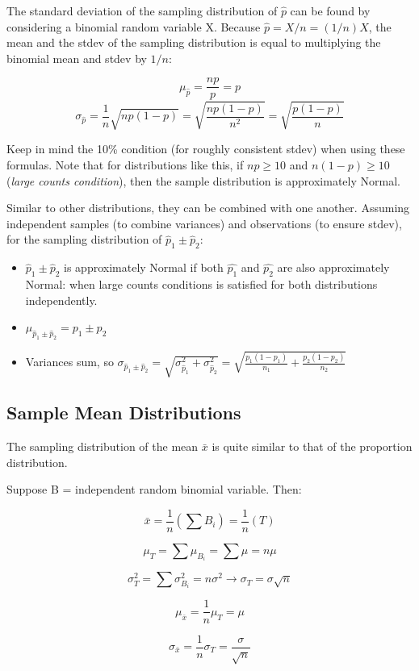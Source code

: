 \documentclass[12pt, a4paper]{article}
\theoremstyle{definition}
\begin{document}
The standard deviation of the sampling distribution of $\hat{p}$ can be found by considering a binomial random variable X.
Because $\hat{p} = X/n = (1/n)X$, the mean and the stdev of the sampling distribution is equal to multiplying the binomial mean and stdev by $1/n$:

\[\mu_{\hat{p}} = \frac{np}{p} = p\]
\[\sigma_{\hat{p}} = \frac{1}{n}\sqrt{np(1-p)} = \sqrt{\frac{np(1-p)}{n^2}} = \sqrt{\frac{p(1-p)}{n}}\]

Keep in mind the 10\% condition (for roughly consistent stdev) when using these formulas.
Note that for distributions like this, if $np \geq 10$ and $n(1-p) \geq 10$ (\textit{large counts condition}), then the sample distribution is approximately Normal.

Similar to other distributions, they can be combined with one another.
Assuming independent samples (to combine variances) and observations (to ensure stdev), for the sampling distribution of $\hat{p}_1 \pm \hat{p}_2$:
\begin{itemize}
    \item $\hat{p}_1 \pm \hat{p}_2$ is approximately Normal if both $\hat{p_1}$ and $\hat{p_2}$ are also approximately Normal: when large counts conditions is satisfied for both distributions independently.
    \item $\mu_{\hat{p}_1 \pm \hat{p}_2} = p_1 \pm p_2$
    \item Variances sum, so $\sigma_{\hat{p}_1 \pm \hat{p}_2} = \sqrt{\sigma^2_{\hat{p}_1} + \sigma^2_{\hat{p}_2}} = \sqrt{\frac{p_1 (1 - p_1)}{n_1} + \frac{p_2 (1 - p_2)}{n_2}}$
\end{itemize}

\subsection{Sample Mean Distributions}
The sampling distribution of the mean $\bar{x}$ is quite similar to that of the proportion distribution.

Suppose B = independent random binomial variable. Then:

\[\bar{x} = \frac{1}{n} (\sum B_i) = \frac{1}{n} (T)\]

\[\mu_T = \sum \mu_{B_i} = \sum {\mu} = n \mu\]

\[\sigma^2_T = \sum \sigma^2_{B_i} = n\sigma^2 \rightarrow \sigma_T = \sigma \sqrt{n}\]

\[\mu_{\bar{x}} = \frac{1}{n} \mu_T = \mu\]

\[\sigma_{\bar{x}} = \frac{1}{n} \sigma_T = \frac{\sigma}{\sqrt{n}}\]
\end{document}

